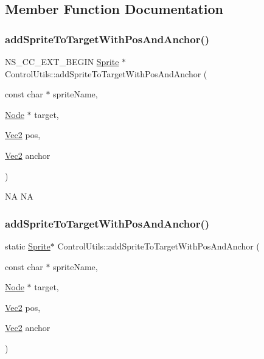 \subsection{Member Function Documentation}
\mbox{\label{classControlUtils_a67096e2a8d8f29be1a213dbe1039e59c}} 
\subsubsection{\texorpdfstring{add\+Sprite\+To\+Target\+With\+Pos\+And\+Anchor()}{addSpriteToTargetWithPosAndAnchor()}\hspace{0.1cm}{\footnotesize\ttfamily [1/2]}}
{\footnotesize\ttfamily N\+S\+\_\+\+C\+C\+\_\+\+E\+X\+T\+\_\+\+B\+E\+G\+IN \hyperlink{classSprite}{Sprite} $\ast$ Control\+Utils\+::add\+Sprite\+To\+Target\+With\+Pos\+And\+Anchor (\begin{DoxyParamCaption}\item[{const char $\ast$}]{sprite\+Name,  }\item[{\hyperlink{classNode}{Node} $\ast$}]{target,  }\item[{\hyperlink{classVec2}{Vec2}}]{pos,  }\item[{\hyperlink{classVec2}{Vec2}}]{anchor }\end{DoxyParamCaption})\hspace{0.3cm}{\ttfamily [static]}}

NA  NA \mbox{\label{classControlUtils_ad4d2b902f91e44d9d27c7e216cf93323}} 
\subsubsection{\texorpdfstring{add\+Sprite\+To\+Target\+With\+Pos\+And\+Anchor()}{addSpriteToTargetWithPosAndAnchor()}\hspace{0.1cm}{\footnotesize\ttfamily [2/2]}}
{\footnotesize\ttfamily static \hyperlink{classSprite}{Sprite}$\ast$ Control\+Utils\+::add\+Sprite\+To\+Target\+With\+Pos\+And\+Anchor (\begin{DoxyParamCaption}\item[{const char $\ast$}]{sprite\+Name,  }\item[{\hyperlink{classNode}{Node} $\ast$}]{target,  }\item[{\hyperlink{classVec2}{Vec2}}]{pos,  }\item[{\hyperlink{classVec2}{Vec2}}]{anchor }\end{DoxyParamCaption})\hspace{0.3cm}{\ttfamily [static]}}

